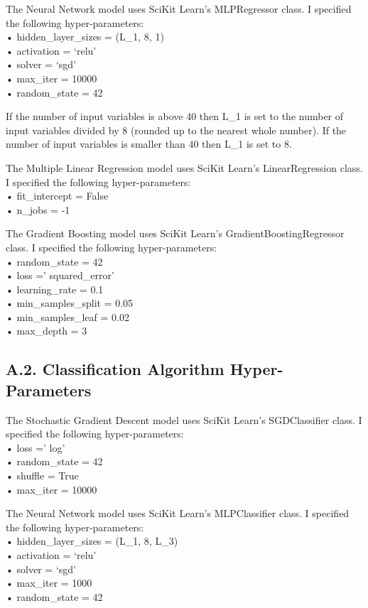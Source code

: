 \documentclass[11pt,preprint, authoryear]{elsarticle}
\numberwithin{equation}{section}
\numberwithin{figure}{section}
\numberwithin{table}{section}
\begin{document}
The Neural Network model uses SciKit Learn's MLPRegressor class. I
specified the following hyper-parameters:\\
• hidden\_layer\_sizes = (L\_1, 8, 1)\\
• activation = `relu'\\
• solver = `sgd'\\
• max\_iter = 10000\\
• random\_state = 42

If the number of input variables is above 40 then L\_1 is set to the
number of input variables divided by 8 (rounded up to the nearest whole
number). If the number of input variables is smaller than 40 then L\_1
is set to 8.

The Multiple Linear Regression model uses SciKit Learn's
LinearRegression class. I specified the following hyper-parameters:\\
• fit\_intercept = False\\
• n\_jobs = -1

The Gradient Boosting model uses SciKit Learn's
GradientBoostingRegressor class. I specified the following
hyper-parameters:\\
• random\_state = 42\\
• loss =' squared\_error'\\
• learning\_rate = 0.1\\
• min\_samples\_split = 0.05\\
• min\_samples\_leaf = 0.02\\
• max\_depth = 3

\hypertarget{a.2.-classification-algorithm-hyper-parameters}{%
\subsection*{A.2. Classification Algorithm
Hyper-Parameters}\label{a.2.-classification-algorithm-hyper-parameters}}

The Stochastic Gradient Descent model uses SciKit Learn's SGDClassifier
class. I specified the following hyper-parameters:\\
• loss =' log'\\
• random\_state = 42\\
• shuffle = True\\
• max\_iter = 10000

The Neural Network model uses SciKit Learn's MLPClassifier class. I
specified the following hyper-parameters:\\
• hidden\_layer\_sizes = (L\_1, 8, L\_3)\\
• activation = `relu'\\
• solver = `sgd'\\
• max\_iter = 1000\\
• random\_state = 42
\end{document}
